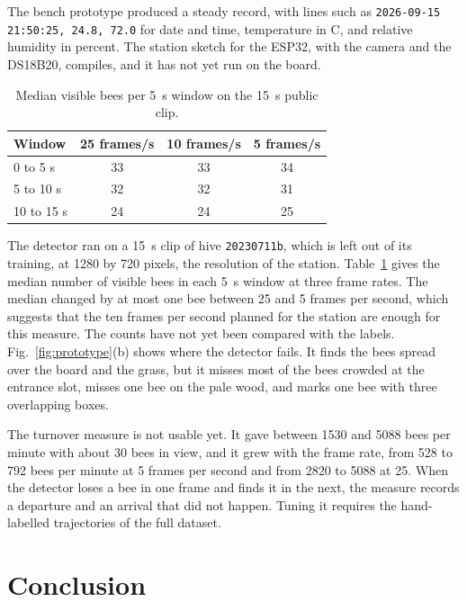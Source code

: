 \documentclass[english,hidelinks]{sbrt}
\begin{document}
The bench prototype produced a steady record, with lines such as \texttt{2026-09-15 21:50:25, 24.8, 72.0} for date and time, temperature in \textdegree{}C, and relative humidity in percent. The station sketch for the ESP32, with the camera and the DS18B20, compiles, and it has not yet run on the board.

\begin{table}[t]
\caption{Median visible bees per 5~s window on the 15~s public clip.}
\label{tab:counts}
\centering
\begin{tabular}{lccc}
\hline
Window & 25 frames/s & 10 frames/s & 5 frames/s \\
\hline
0 to 5 s & 33 & 33 & 34 \\
5 to 10 s & 32 & 32 & 31 \\
10 to 15 s & 24 & 24 & 25 \\
\hline
\end{tabular}
\end{table}

The detector ran on a 15~s clip of hive \texttt{20230711b}, which is left out of its training, at 1280 by 720 pixels, the resolution of the station. Table~\ref{tab:counts} gives the median number of visible bees in each 5~s window at three frame rates. The median changed by at most one bee between 25 and 5 frames per second, which suggests that the ten frames per second planned for the station are enough for this measure. The counts have not yet been compared with the labels. Fig.~\ref{fig:prototype}(b) shows where the detector fails. It finds the bees spread over the board and the grass, but it misses most of the bees crowded at the entrance slot, misses one bee on the pale wood, and marks one bee with three overlapping boxes.

The turnover measure is not usable yet. It gave between 1530 and 5088 bees per minute with about 30 bees in view, and it grew with the frame rate, from 528 to 792 bees per minute at 5 frames per second and from 2820 to 5088 at 25. When the detector loses a bee in one frame and finds it in the next, the measure records a departure and an arrival that did not happen. Tuning it requires the hand-labelled trajectories of the full dataset.

\section{Conclusion}
\label{sec:conclusion}
\end{document}
